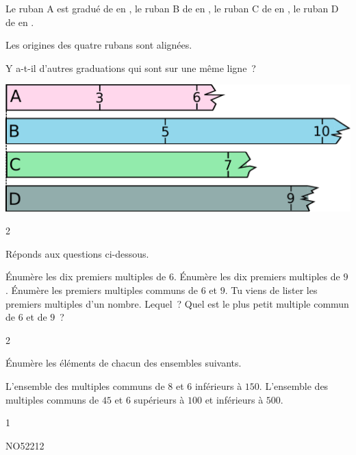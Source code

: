 \documentclass[a4paper,12pt]{report}
\begin{document}
\begin{exo}{ %
		Le ruban A est gradué de  en , le ruban B de  en , le ruban C de  en , le ruban D de  en . 

    Les origines des quatre rubans sont alignées. 

    Y a-t-il d'autres graduations qui sont sur une même ligne~? 

    \begin{center}
    \includegraphics[scale=0.4]{media/no-04/ruban}
\end{center}
}{2}\end{exo}




\begin{exo}{
    Réponds aux questions ci-dessous.

\begin{tasks}[after-item-skip = 0.5em]
    \task Énumère les dix premiers multiples de $6$.
    \task Énumère les dix premiers multiples de $9$.
    \task Énumère les premiers multiples communs de $6$ et $9$.
    \task Tu viens de lister les premiers multiples d'un nombre. Lequel~?
    \task Quel est le plus petit multiple commun de $6$ et de $9$~?
\end{tasks}
}{2}\end{exo}

\vfill

\begin{exo}{
    Énumère les éléments de chacun des ensembles suivants.
\begin{tasks}[after-item-skip = 0.5em]
    \task L'ensemble des multiples communs de $8$ et $6$ inférieurs à $150$.
    \task L'ensemble des multiples communs de $45$ et $6$ supérieurs à $100$ et inférieurs à $500$.
\end{tasks}
}{1}\end{exo}

\vfill

\begin{exol}{NO52}{21}{2}
\end{exol}
\end{document}
